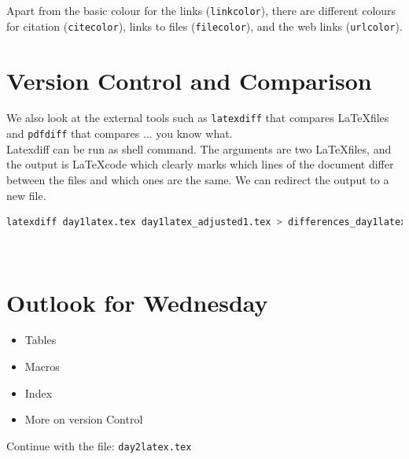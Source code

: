 \documentclass[a4paper,10pt]{report} %
\begin{document}
 Apart from the basic colour for the links (\texttt{linkcolor}), there are different colours for citation (\texttt{citecolor}), links to files (\texttt{filecolor}), and the web links (\texttt{urlcolor}).
 \pagebreak
 
 \section{Version Control and Comparison}
 We also look at the external tools such as \texttt{latexdiff} that compares \LaTeX files and  \texttt{pdfdiff} that compares \( \ldots \) you know what.\\
 
 Latexdiff can be run as shell command. The arguments are two \LaTeX files, and the output is \LaTeX code which clearly marks which lines of the document differ between the files and which ones are the same. We can redirect the output to a new file.
 
 \begin{lstlisting}[language={bash}, frame=single,basicstyle=\footnotesize
    ,basicstyle=\footnotesize\color{cyan}    % setting font
   ,keywordstyle=\color{magenta}            % setting font for keywords 
   ,stringstyle=\color{brown}
   ,commentstyle=\color{ForestGreen} 
 ]
  latexdiff day1latex.tex day1latex_adjusted1.tex > differences_day1latex.tex
\end{lstlisting}~\vspace{1ex}
  



\section{Outlook for Wednesday}\label{sec:wednesday}

\begin{itemize}
 \item Tables
 \item Macros
 \item Index
 \item More on version Control
\end{itemize}

Continue with the file: \texttt{day2latex.tex}


 
\label{LastPage}
\newpage
\end{document}
